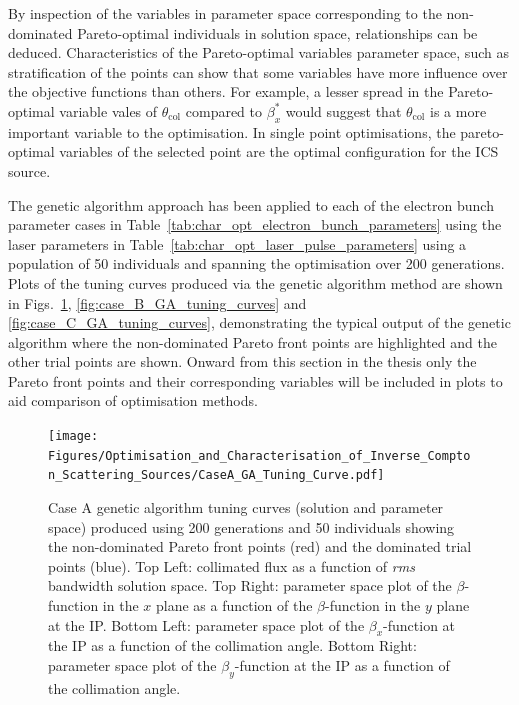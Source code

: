 \documentclass[../main.tex]{subfiles}
\begin{document}
By inspection of the variables in parameter space corresponding to the non-dominated Pareto-optimal individuals in solution space, relationships can be deduced. Characteristics of the Pareto-optimal variables parameter space, such as stratification of the points can show that some variables have more influence over the objective functions than others. For example, a lesser spread in the Pareto-optimal variable vales of $\theta_{\mathrm{col}}$ compared to $\beta_{x}^{*}$ would suggest that $\theta_{\mathrm{col}}$ is a more important variable to the optimisation. In single point optimisations, the pareto-optimal variables of the selected point are the optimal configuration for the ICS source.  

The genetic algorithm approach has been applied to each of the electron bunch parameter cases in Table~\ref{tab:char_opt_electron_bunch_parameters} using the laser parameters in Table~\ref{tab:char_opt_laser_pulse_parameters} using a population of 50 individuals and spanning the optimisation over 200 generations. Plots of the tuning curves produced via the genetic algorithm method are shown in Figs.~\ref{fig:case_A_GA_tuning_curves}, \ref{fig:case_B_GA_tuning_curves} and \ref{fig:case_C_GA_tuning_curves}, demonstrating the typical output of the genetic algorithm where the non-dominated Pareto front points are highlighted and the other trial points are shown. Onward from this section in the thesis only the Pareto front points and their corresponding variables will be included in plots to aid comparison of optimisation methods.

\begin{figure}[!h]
\centering
\texttt{[image: Figures/Optimisation\_and\_Characterisation\_of\_Inverse\_Compton\_Scattering\_Sources/CaseA\_GA\_Tuning\_Curve.pdf]}
\caption{Case A genetic algorithm tuning curves (solution and parameter space) produced using 200 generations and 50 individuals showing the non-dominated Pareto front points (red) and the dominated trial points (blue). Top Left: collimated flux as a function of \textit{rms} bandwidth solution space. Top Right: parameter space plot of the $\beta$-function in the $x$ plane as a function of the $\beta$-function in the $y$ plane at the IP. Bottom Left: parameter space plot of the $\beta_{x}$-function at the IP as a function of the collimation angle. Bottom Right: parameter space plot of the $\beta_{y}$-function at the IP as a function of the collimation angle.}
\label{fig:case_A_GA_tuning_curves}
\end{figure}
\end{document}
